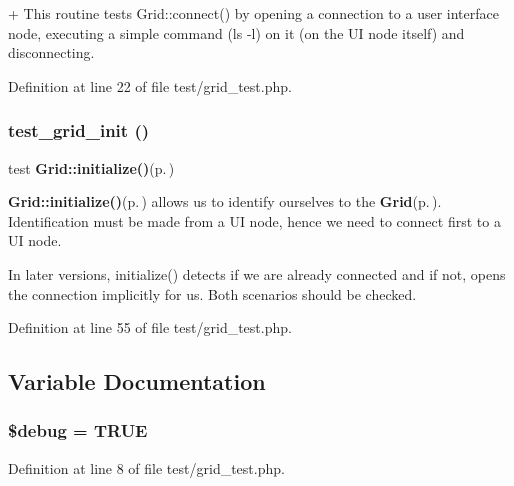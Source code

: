 + This routine tests Grid::connect() by opening a connection to a user interface node, executing a simple command (ls -l) on it (on the UI node itself) and disconnecting. 

Definition at line 22 of file test/grid\_\-test.php.
\subsubsection{\setlength{\rightskip}{0pt plus 5cm}test\_\-grid\_\-init ()}\label{test_2grid__test_8php_a2}


test {\bf Grid::initialize()}{\rm (p.\,\pageref{classGrid_a18})} 

{\bf Grid::initialize()}{\rm (p.\,\pageref{classGrid_a18})} allows us to identify ourselves to the {\bf Grid}{\rm (p.\,\pageref{classGrid})}. Identification must be made from a UI node, hence we need to connect first to a UI node.

In later versions, initialize() detects if we are already connected and if not, opens the connection implicitly for us. Both scenarios should be checked. 

Definition at line 55 of file test/grid\_\-test.php.

\subsection{Variable Documentation}
\subsubsection{\setlength{\rightskip}{0pt plus 5cm}\$debug = TRUE}\label{test_2grid__test_8php_a0}




Definition at line 8 of file test/grid\_\-test.php.